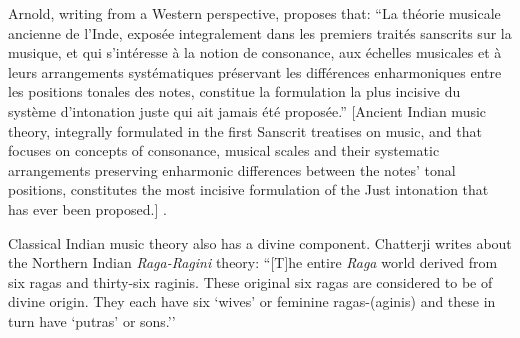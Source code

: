 Arnold, writing from a Western perspective, proposes that: ``La théorie musicale ancienne de l'Inde, exposée integralement dans les premiers traités sanscrits sur la musique, et qui s'intéresse à la notion de consonance, aux échelles musicales et à leurs arrangements systématiques préservant les différences enharmoniques entre les positions tonales des notes, constitue la formulation la plus incisive du système d'intonation juste qui ait jamais été proposée.'' [Ancient Indian music theory, integrally formulated in the first Sanscrit treatises on music, and that focuses on concepts of consonance, musical scales and their systematic arrangements preserving enharmonic differences between the notes’ tonal positions, constitutes the most incisive formulation of the Just intonation that has ever been proposed.] \cite[translated from French][p.~11]{arnold1985intonation}.

Classical Indian music theory also has a divine component. Chatterji writes about the Northern Indian \textit{Raga-Ragini} theory: ``[T]he entire \textit{Raga} world derived from six ragas and thirty-six raginis. These original six ragas are considered to be of divine origin. They each have six `wives’ or feminine ragas-(aginis) and these in turn have `putras’ or sons.'' \parencite[p.~362]{chatterji1958indian}

